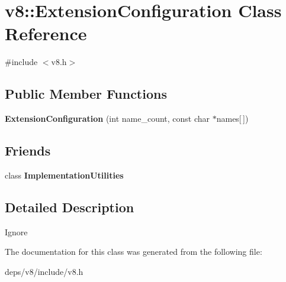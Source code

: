 \hypertarget{classv8_1_1_extension_configuration}{}\section{v8\+:\+:Extension\+Configuration Class Reference}
\label{classv8_1_1_extension_configuration}


{\ttfamily \#include $<$v8.\+h$>$}

\subsection*{Public Member Functions}
\begin{DoxyCompactItemize}
\item 
\hypertarget{classv8_1_1_extension_configuration_a1189e46efe963db4aa7340cc767f276a}{}{\bfseries Extension\+Configuration} (int name\+\_\+count, const char $\ast$names\mbox{[}$\,$\mbox{]})\label{classv8_1_1_extension_configuration_a1189e46efe963db4aa7340cc767f276a}

\end{DoxyCompactItemize}
\subsection*{Friends}
\begin{DoxyCompactItemize}
\item 
\hypertarget{classv8_1_1_extension_configuration_ac7b520085953e146d849e05253267f72}{}class {\bfseries Implementation\+Utilities}\label{classv8_1_1_extension_configuration_ac7b520085953e146d849e05253267f72}

\end{DoxyCompactItemize}


\subsection{Detailed Description}
Ignore 

The documentation for this class was generated from the following file\+:\begin{DoxyCompactItemize}
\item 
deps/v8/include/v8.\+h\end{DoxyCompactItemize}
